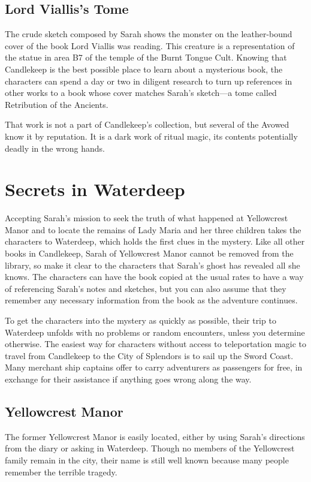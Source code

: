 \documentclass[10pt,a4paper,twoside,bg=print,twocolumn,openany,nodeprecatedcode]{dndbook}
\begin{document}
\subsection{Lord Viallis's Tome}
The crude sketch composed by Sarah shows the monster on the leather-bound cover of the book Lord Viallis was reading. This creature is a representation of the statue in area B7 of the temple of the Burnt Tongue Cult. Knowing that Candlekeep is the best possible place to learn about a mysterious book, the characters can spend a day or two in diligent research to turn up references in other works to a book whose cover matches Sarah's sketch—a tome called Retribution of the Ancients.

That work is not a part of Candlekeep's collection, but several of the Avowed know it by reputation. It is a dark work of ritual magic, its contents potentially deadly in the wrong hands.

\section{Secrets in Waterdeep}
Accepting Sarah's mission to seek the truth of what happened at Yellowcrest Manor and to locate the remains of Lady Maria and her three children takes the characters to Waterdeep, which holds the first clues in the mystery. Like all other books in Candlekeep, Sarah of Yellowcrest Manor cannot be removed from the library, so make it clear to the characters that Sarah's ghost has revealed all she knows. The characters can have the book copied at the usual rates to have a way of referencing Sarah's notes and sketches, but you can also assume that they remember any necessary information from the book as the adventure continues.

To get the characters into the mystery as quickly as possible, their trip to Waterdeep unfolds with no problems or random encounters, unless you determine otherwise. The easiest way for characters without access to teleportation magic to travel from Candlekeep to the City of Splendors is to sail up the Sword Coast. Many merchant ship captains offer to carry adventurers as passengers for free, in exchange for their assistance if anything goes wrong along the way.

\subsection{Yellowcrest Manor}
The former Yellowcrest Manor is easily located, either by using Sarah's directions from the diary or asking in Waterdeep. Though no members of the Yellowcrest family remain in the city, their name is still well known because many people remember the terrible tragedy.
\end{document}
